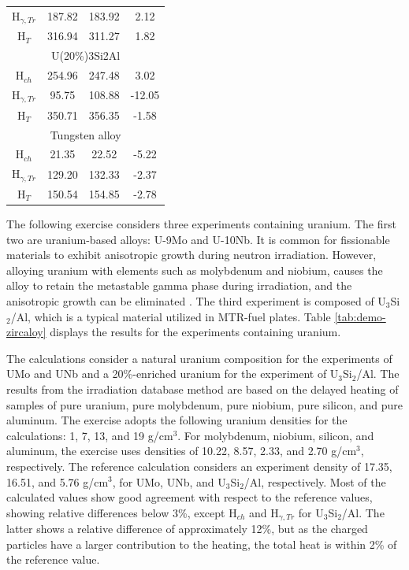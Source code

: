 \begin{table}[htbp!]
\begin{tabular}{cccc}
    H$_{\gamma, Tr}$    & 187.82   & 183.92  &  2.12  \\
    H$_{T}$             & 316.94   & 311.27  &  1.82  \\
    \midrule
    \multicolumn{4}{c}{U(20\%)3Si2Al}                 \\
    \midrule
    H$_{ch}$            & 254.96   & 247.48  &  3.02  \\
    H$_{\gamma, Tr}$    &  95.75   & 108.88  &-12.05  \\
    H$_{T}$             & 350.71   & 356.35  & -1.58  \\
    \midrule
    \multicolumn{4}{c}{Tungsten alloy}    \\
    \midrule
    H$_{ch}$            &  21.35   &  22.52  & -5.22  \\
    H$_{\gamma, Tr}$    & 129.20   & 132.33  & -2.37  \\
    H$_{T}$             & 150.54   & 154.85  & -2.78  \\
    \bottomrule
  \end{tabular}
\end{table}

The following exercise considers three experiments containing uranium.
The first two are uranium-based alloys: U-9Mo and U-10Nb.
It is common for fissionable materials to exhibit anisotropic growth during neutron irradiation.
However, alloying uranium with elements such as molybdenum and niobium, causes the alloy to retain the metastable gamma phase during irradiation, and the anisotropic growth can be eliminated \cite{bleiberg_2004}.
The third experiment is composed of U$_3$Si$_2$/Al, which is a typical material utilized in \gls*{MTR}-fuel plates.
% 
Table \ref{tab:demo-zircaloy} displays the results for the experiments containing uranium.

The calculations consider a natural uranium composition for the experiments of UMo and UNb and a 20\%-enriched uranium for the experiment of U$_3$Si$_2$/Al.
The results from the irradiation database method are based on the delayed heating of samples of pure uranium, pure molybdenum, pure niobium, pure silicon, and pure aluminum.
The exercise adopts the following uranium densities for the calculations: 1, 7, 13, and 19 g/cm$^3$.
For molybdenum, niobium, silicon, and aluminum, the exercise uses densities of 10.22, 8.57, 2.33, and 2.70 g/cm$^3$, respectively.
The reference calculation considers an experiment density of 17.35, 16.51, and 5.76 g/cm$^3$, for UMo, UNb, and U$_3$Si$_2$/Al, respectively.
Most of the calculated values show good agreement with respect to the reference values, showing relative differences below 3\%, except H$_{ch}$ and H$_{\gamma, Tr}$ for U$_3$Si$_2$/Al.
The latter shows a relative difference of approximately 12\%, but as the charged particles have a larger contribution to the heating, the total heat is within 2\% of the reference value.

